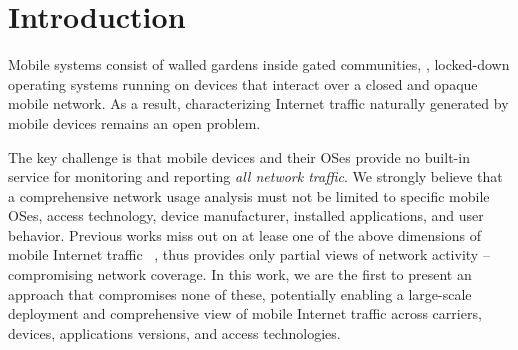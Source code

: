 \section{Introduction}
\label{sec:introduction}

Mobile systems consist of walled gardens inside gated communities, \ie{}, locked-down operating systems running on devices that interact over a closed and opaque mobile network. 
As a result, characterizing Internet traffic naturally generated by mobile devices remains an open problem. 

The key challenge is that mobile devices and their OSes provide no built-in service for monitoring and reporting \emph{all network traffic}. 
We strongly believe that a comprehensive network usage analysis must not be limited to specific mobile OSes, access technology, device manufacturer, installed applications, and user behavior. 
Previous works miss out on at lease one of the above dimensions of mobile Internet traffic ~\cite{anyattstudy, wifistudy,mobilelab,mobiperf}, thus provides only partial views of network activity -- compromising network coverage. 
In this work, we are the first to present an approach that compromises none of these, potentially enabling a large-scale deployment and comprehensive view of  mobile Internet traffic across carriers, devices, applications versions, and access technologies.


